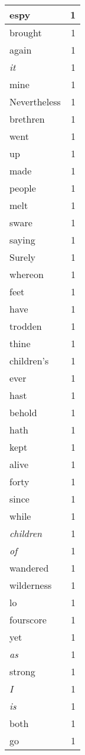 \begin{center}
\begin{longtable}{l|r}
espy & 1\\ \hline 
brought & 1\\ \hline 
again & 1\\ \hline 
\emph{it} & 1\\ \hline 
mine & 1\\ \hline 
Nevertheless & 1\\ \hline 
brethren & 1\\ \hline 
went & 1\\ \hline 
up & 1\\ \hline 
made & 1\\ \hline 
people & 1\\ \hline 
melt & 1\\ \hline 
sware & 1\\ \hline 
saying & 1\\ \hline 
Surely & 1\\ \hline 
whereon & 1\\ \hline 
feet & 1\\ \hline 
have & 1\\ \hline 
trodden & 1\\ \hline 
thine & 1\\ \hline 
children's & 1\\ \hline 
ever & 1\\ \hline 
hast & 1\\ \hline 
behold & 1\\ \hline 
hath & 1\\ \hline 
kept & 1\\ \hline 
alive & 1\\ \hline 
forty & 1\\ \hline 
since & 1\\ \hline 
while & 1\\ \hline 
\emph{children} & 1\\ \hline 
\emph{of} & 1\\ \hline 
wandered & 1\\ \hline 
wilderness & 1\\ \hline 
lo & 1\\ \hline 
fourscore & 1\\ \hline 
yet & 1\\ \hline 
\emph{as} & 1\\ \hline 
strong & 1\\ \hline 
\emph{I} & 1\\ \hline 
\emph{is} & 1\\ \hline 
both & 1\\ \hline 
go & 1\\ \hline 

\end{longtable}
\end{center}
